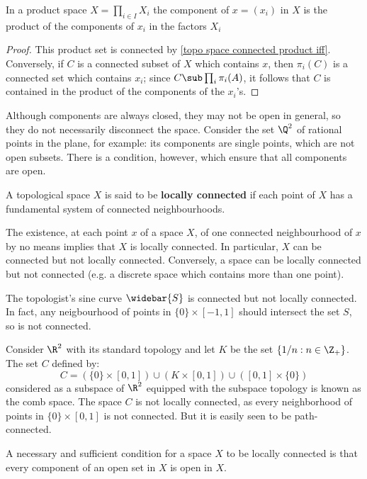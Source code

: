 \begin{proposition}\label{topo space component of product}
In a product space $X=\prod_{i\in I}X_i$ the component of $x=(x_i)$ in $X$ is the product of the components of $x_i$ in the factors $X_i$
\end{proposition}
\begin{proof}
This product set is connected by \cref{topo space connected product iff}. Conversely, if $C$ is a connected subset of $X$ which contains $x$, then $\pi_i(C)$ is a connected set which contains $x_i$; since $C\sub\prod_i\pi_i(A)$, it follows that $C$ is contained in the product of the components of the $x_i$'s.
\end{proof}
Although components are always closed, they may not be open in general, so they do not necessarily disconnect the space. Consider the set $\Q^2$ of rational points in the plane, for example: its components are single points, which are not open subsets. There is a condition, however, which ensure that all components are open.
\begin{definition}
A topological space $X$ is said to be \textbf{locally connected} if each point of $X$ has a fundamental system of connected neighbourhoods.
\end{definition}
The existence, at each point $x$ of a space $X$, of one connected neighbourhood of $x$ by no means implies that $X$ is locally connected. In particular, $X$ can be connected but not locally connected. Conversely, a space can be locally connected but not connected (e.g. a discrete space which contains more than one point).
\begin{example}
The topologist's sine curve $\widebar{S}$ is connected but not locally connected. In fact, any neigbourhood of points in $\{0\}\times[-1,1]$ should intersect the set $S$, so is not connected.
\end{example}
\begin{example}
Consider $\R^2$ with its standard topology and let $K$ be the set $\{1/n:n\in\Z_+\}$. The set $C$ defined by:
\[C=(\{0\}\times[0,1])\cup(K\times[0,1])\cup([0,1]\times\{0\})\]
considered as a subspace of $\R^2$ equipped with the subspace topology is known as the comb space. The space $C$ is not locally connected, as every neighborhood of points in $\{0\}\times[0,1]$ is not connected. But it is easily seen to be path-connected.
\end{example}
\begin{proposition}\label{topo space locally connected iff compoenent open}
A necessary and sufficient condition for a space $X$ to be locally connected is that every component of an open set in $X$ is open in $X$.
\end{proposition}
